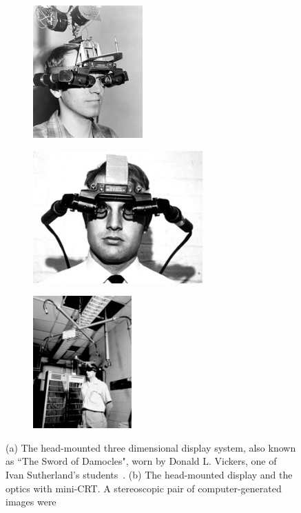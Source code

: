 \begin{figure}[t]
\centering
\begin{subfigure}[t]{1.75in}
  \centering
  \includegraphics[height=2.0in]{ch1/figures/sutherland/3.jpeg}
  \caption{}
  \label{ivansetup1}
\end{subfigure}
\begin{subfigure}[t]{2.6in}
  \centering
  \includegraphics[height=2.0in]{ch1/figures/sutherland/2.jpeg}
  \caption{}
  \label{ivansetup2}
\end{subfigure}
\begin{subfigure}[t]{1.4in}
  \centering
  \includegraphics[height=2.0in]{ch1/figures/sutherland/1.jpeg}
  \caption{}
  \label{ivansetup3}
\end{subfigure}
\caption{(a) The head-mounted three dimensional display system, also known as ``The Sword of 
Damocles", worn by Donald L. Vickers, one of Ivan Sutherland's students~\cite{sutherland1968head}. (b) The head-mounted 
display and the optics with mini-CRT. A stereoscopic pair of computer-generated images were 
}
\end{figure}
